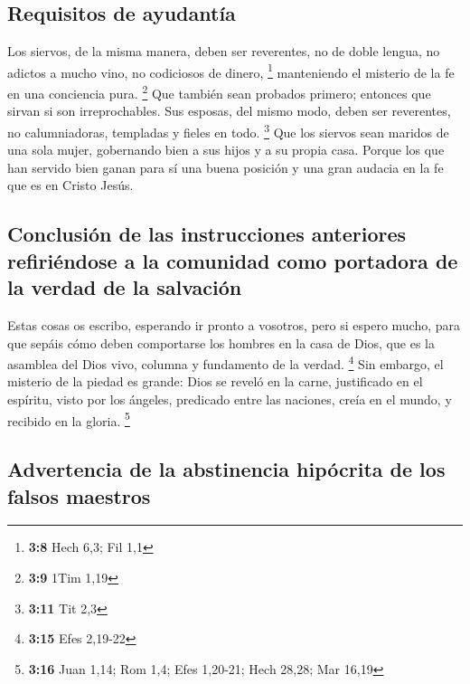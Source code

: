 \hypertarget{requisitos-de-ayudantuxeda}{%
\subsection{Requisitos de ayudantía}\label{requisitos-de-ayudantuxeda}}

 Los siervos, de la misma manera, deben ser reverentes, no
de doble lengua, no adictos a mucho vino, no codiciosos de dinero,
\footnote{\textbf{3:8} Hech 6,3; Fil 1,1}  manteniendo el
misterio de la fe en una conciencia pura. \footnote{\textbf{3:9} 1Tim
  1,19}  Que también sean probados primero; entonces que
sirvan si son irreprochables.  Sus esposas, del mismo
modo, deben ser reverentes, no calumniadoras, templadas y fieles en
todo. \footnote{\textbf{3:11} Tit 2,3}  Que los siervos
sean maridos de una sola mujer, gobernando bien a sus hijos y a su
propia casa.  Porque los que han servido bien ganan para
sí una buena posición y una gran audacia en la fe que es en Cristo
Jesús.

\hypertarget{conclusiuxf3n-de-las-instrucciones-anteriores-refiriuxe9ndose-a-la-comunidad-como-portadora-de-la-verdad-de-la-salvaciuxf3n}{%
\subsection{Conclusión de las instrucciones anteriores refiriéndose a la
comunidad como portadora de la verdad de la
salvación}\label{conclusiuxf3n-de-las-instrucciones-anteriores-refiriuxe9ndose-a-la-comunidad-como-portadora-de-la-verdad-de-la-salvaciuxf3n}}

 Estas cosas os escribo, esperando ir pronto a vosotros,
 pero si espero mucho, para que sepáis cómo deben
comportarse los hombres en la casa de Dios, que es la asamblea del Dios
vivo, columna y fundamento de la verdad. \footnote{\textbf{3:15} Efes
  2,19-22}  Sin embargo, el misterio de la piedad es
grande: Dios se reveló en la carne, justificado en el espíritu, visto
por los ángeles, predicado entre las naciones, creía en el mundo, y
recibido en la gloria. \footnote{\textbf{3:16} Juan 1,14; Rom 1,4; Efes
  1,20-21; Hech 28,28; Mar 16,19}

\hypertarget{advertencia-de-la-abstinencia-hipuxf3crita-de-los-falsos-maestros}{%
\subsection{Advertencia de la abstinencia hipócrita de los falsos
maestros}\label{advertencia-de-la-abstinencia-hipuxf3crita-de-los-falsos-maestros}}

